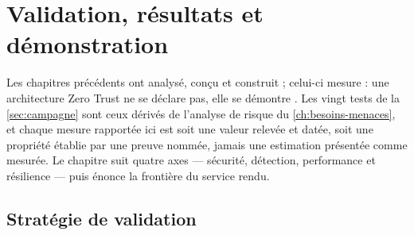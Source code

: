 \chapter{Validation, résultats et démonstration}
\label{ch:validation}
\setcounter{topnumber}{3}\setcounter{bottomnumber}{2}\setcounter{totalnumber}{5}
\renewcommand{\topfraction}{0.92}\renewcommand{\bottomfraction}{0.7}
\renewcommand{\textfraction}{0.06}\renewcommand{\floatpagefraction}{0.78}
\setlength{\LTpre}{6pt}\setlength{\LTpost}{6pt}

Les chapitres précédents ont analysé, conçu et construit ; celui-ci mesure : une architecture Zero
Trust ne se déclare pas, elle se démontre \cite{nist800207}. Les vingt tests de la
\cref{sec:campagne} sont ceux dérivés de l'analyse de risque du \cref{ch:besoins-menaces}, et chaque mesure
rapportée ici est soit une valeur relevée et datée, soit une propriété établie par une preuve
nommée, jamais une estimation présentée comme mesurée. Le chapitre suit quatre axes --- sécurité,
détection, performance et résilience --- puis énonce la frontière du service rendu.

\section{Stratégie de validation}
\label{sec:strategie}

